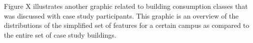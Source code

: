 Figure X illustrates another graphic related to building consumption classes that was discussed with case study participants. This graphic is an overview of the distributions of the simplified set of features for a certain campus as compared to the entire set of case study buildings.